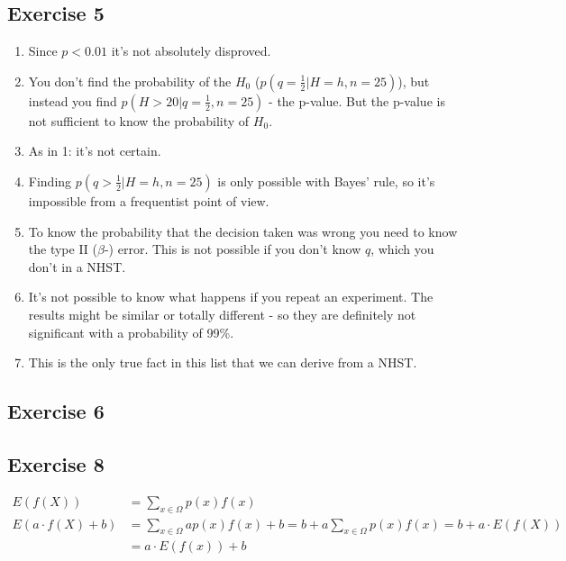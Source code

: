 \subsection*{Exercise 5}
\begin{enumerate}
	\item Since $p < 0.01$ it's not absolutely disproved.
  \item You don't find the probability of the $H_0$ ($p(q=\frac{1}{2}|H=h,n=25)$), but instead you find $p(H>20|q=\frac{1}{2},n=25)$ - the p-value. But the p-value is not sufficient to know the probability of $H_0$.
  \item As in 1: it's not certain.
  \item Finding $p(q>\frac{1}{2}|H=h,n=25)$ is only possible with Bayes' rule, so it's impossible from a frequentist point of view.
  \item To know the probability that the decision taken was wrong you need to know the type II ($\beta$-) error. This is not possible if you don't know $q$, which you don't in a NHST.
  \item It's not possible to know what happens if you repeat an experiment. The results might be similar or totally different - so they are definitely not significant with a probability of 99\%.
  \item This is the only true fact in this list that we can derive from a NHST.
\end{enumerate}

\subsection*{Exercise 6}


\subsection*{Exercise 8}
\begin{align*}
E(f(X)) &= \sum_{x\in\Omega}p(x)f(x) \\
E(a\cdot f(X) + b) &= \sum_{x\in\Omega}ap(x)f(x)+b = b+a\sum_{x\in\Omega}p(x)f(x) = b+a\cdot E(f(X))\\
                   &= a\cdot E(f(x)) + b
\end{align*}

